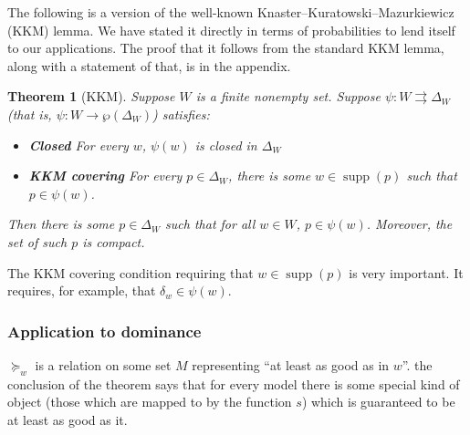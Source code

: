 \documentclass[11pt]{article}
\newtheorem{theorem}{Theorem}[section]
\theoremstyle{definition}
\newtheorem{definition}[theorem]{Definition}
\theoremstyle{remark}
\newcommand{\supp}{\operatorname{supp}}
\begin{document}
The following is a version of the well-known Knaster–Kuratowski–Mazurkiewicz (KKM) lemma. We have stated it directly in terms of probabilities to lend itself to our applications. The proof that it follows from the standard KKM lemma, along with a statement of that, is in the appendix. 

\begin{theorem}[KKM]
	Suppose $W$ is a finite nonempty set.
	Suppose $\psi:W\rightrightarrows \Delta_W$ (that is, $\psi\colon W\rightarrow\wp(\Delta_W)$) satisfies:\begin{itemize}
	\item \textbf{Closed} For every $w$, $\psi(w)$ is closed in $\Delta_W$
	\item \textbf{KKM covering} For every $p\in \Delta_W$, there is some $w\in\supp(p)$ such that $p\in\psi(w)$.
\end{itemize}
Then there is some $p\in \Delta_W$ such that for all $w\in W$, $p\in\psi(w)$. Moreover, the set of such $p$ is compact.
\end{theorem}
The KKM covering condition requiring that $w\in\supp(p)$ is very important. It requires, for example, that $\delta_w\in \psi(w)$.

\subsubsection{Application to dominance}

$\succeq_w$ is a relation on some set $M$ representing  ``at least as good as in $w$''.
the conclusion of the theorem says that for every model there is some special kind of object (those which are mapped to by the function $s$) which is guaranteed to be at least as good as it. 

\end{document}
